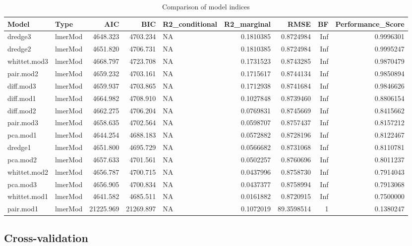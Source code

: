 \documentclass[]{article}
\begin{document}
\begin{table}[!h]

\caption{\label{tab:model-performance}Comparison of model indices}
\centering
\fontsize{9}{11}\selectfont
\begin{tabular}[t]{llrrlrrrr}
\toprule
Model & Type & AIC & BIC & R2\_conditional & R2\_marginal & RMSE & BF & Performance\_Score\\
\midrule
dredge3 & lmerMod & 4648.323 & 4703.234 & NA & 0.1810385 & 0.8724984 & Inf & 0.9996301\\
dredge2 & lmerMod & 4651.820 & 4706.731 & NA & 0.1810385 & 0.8724984 & Inf & 0.9995247\\
whittet.mod3 & lmerMod & 4668.797 & 4723.708 & NA & 0.1731523 & 0.8743285 & Inf & 0.9870479\\
pair.mod2 & lmerMod & 4659.232 & 4703.161 & NA & 0.1715617 & 0.8744134 & Inf & 0.9850894\\
diff.mod3 & lmerMod & 4659.937 & 4703.865 & NA & 0.1712938 & 0.8741684 & Inf & 0.9846626\\
\addlinespace
diff.mod1 & lmerMod & 4664.982 & 4708.910 & NA & 0.1027848 & 0.8739460 & Inf & 0.8806154\\
diff.mod2 & lmerMod & 4662.275 & 4706.204 & NA & 0.0769831 & 0.8745669 & Inf & 0.8415662\\
pair.mod3 & lmerMod & 4658.635 & 4702.564 & NA & 0.0598707 & 0.8757437 & Inf & 0.8157212\\
pca.mod1 & lmerMod & 4644.254 & 4688.183 & NA & 0.0572882 & 0.8728196 & Inf & 0.8122467\\
dredge1 & lmerMod & 4651.800 & 4695.729 & NA & 0.0566682 & 0.8731068 & Inf & 0.8110781\\
\addlinespace
pca.mod2 & lmerMod & 4657.633 & 4701.561 & NA & 0.0502257 & 0.8760696 & Inf & 0.8011237\\
whittet.mod2 & lmerMod & 4656.787 & 4700.715 & NA & 0.0437996 & 0.8758730 & Inf & 0.7914043\\
pca.mod3 & lmerMod & 4656.905 & 4700.834 & NA & 0.0437377 & 0.8758994 & Inf & 0.7913068\\
whittet.mod1 & lmerMod & 4641.582 & 4685.511 & NA & 0.0161882 & 0.8720915 & Inf & 0.7500000\\
pair.mod1 & lmerMod & 21225.969 & 21269.897 & NA & 0.1072019 & 89.3598514 & 1 & 0.1380247\\
\bottomrule
\end{tabular}
\end{table}

\subsection{Cross-validation}\label{cross-validation}
\end{document}
